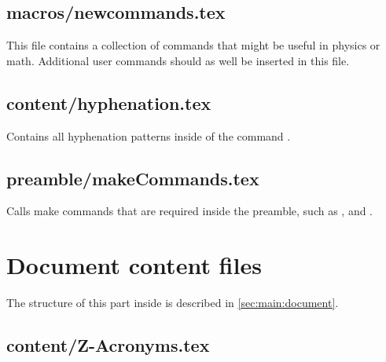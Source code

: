 
\section{macros/newcommands.tex}

This file contains a collection of commands that might be useful in physics or math. Additional user commands should as well be inserted in this file.


\section{content/hyphenation.tex}

Contains all hyphenation patterns inside of the command .


\section{preamble/makeCommands.tex}

Calls make commands that are required inside the preamble, such as 
,  and .


\chapter{Document content files}

The structure of this part inside  is described in  \vref{sec:main:document}.

\section{content/Z-Acronyms.tex}

